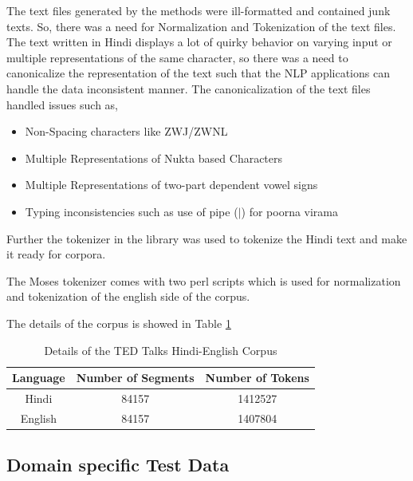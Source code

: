 The text files generated by the methods were ill-formatted and contained junk texts. So, there was a need for Normalization and Tokenization of the text files. The text written in Hindi displays a lot of quirky behavior on varying input or multiple representations of the same character, so there was a need to canonicalize the representation of the text such that the NLP applications can handle the data inconsistent manner. The canonicalization of the text files handled issues such as,
\begin{itemize}
\item Non-Spacing characters like ZWJ/ZWNL
\item Multiple Representations of Nukta based Characters
\item Multiple Representations of two-part dependent vowel signs
\item Typing inconsistencies such as use of pipe ($|$) for poorna virama 
\end{itemize}

Further the tokenizer in the library was used to tokenize the Hindi text and make it ready for corpora.

The Moses tokenizer comes with two perl scripts  which  is used for normalization and tokenization of the english side of the corpus.

The details of the corpus is showed in Table \ref{corpustable} 

\begin{table}[h!]
\centering
 \begin{tabular}{ |ccc| } 
  \hline Language & Number of Segments & Number of Tokens \\ 
  \hline  Hindi &  84157 & 1412527\\
  English & 84157 & 1407804\\
  \hline
 \end{tabular}
\caption{Details of the TED Talks Hindi-English Corpus}
\label{corpustable}
\end{table}

\subsection{Domain specific Test Data}
